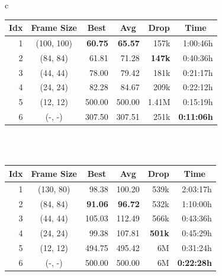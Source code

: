 \begin{table}[htp]
    \begin{center}
        \begin{threeparttable}
            \begin{tabular}{c}
                \begin{tabular}{rcrrrr}
                    \toprule
                    \multicolumn{1}{c}{Idx} & \multicolumn{1}{c}{Frame Size} & \multicolumn{1}{c}{Best} & \multicolumn{1}{c}{Avg} & \multicolumn{1}{c}{Drop} & \multicolumn{1}{c}{Time}\\
                    \midrule
                    1 & (100, 100) & \textbf{60.75} & \textbf{65.57} & 157k & 1:00:46h \\
                    2 & (84, 84) & 61.81 & 71.28 & \textbf{147k} & 0:40:36h \\
                    3 & (44, 44) & 78.00 & 79.42 & 181k & 0:21:17h \\
                    4 & (24, 24) & 82.28 & 84.67 & 209k & 0:22:12h \\
                    5 & (12, 12) & 500.00 & 500.00 & 1.41M & 0:15:19h \\
                    6 & (-, -) & 307.50 & 307.51 & 251k & \textbf{0:11:06h} \\
                    \bottomrule
                \end{tabular} \\
                 \\
                \addlinespace[0.5cm]
                \begin{tabular}{rcrrrr}
                    \toprule
                    \multicolumn{1}{c}{Idx} & \multicolumn{1}{c}{Frame Size} & \multicolumn{1}{c}{Best} & \multicolumn{1}{c}{Avg} & \multicolumn{1}{c}{Drop} & \multicolumn{1}{c}{Time}\\
                    \midrule
                    1 & (130, 80) & 98.38 & 100.20 & 539k & 2:03:17h \\
                    2 & (84, 84) & \textbf{91.06} & \textbf{96.72} & 532k & 1:10:00h \\
                    3 & (44, 44) & 105.03 & 112.49 & 566k & 0:43:36h \\
                    4 & (24, 24) & 99.38 & 107.81 & \textbf{501k} & 0:45:29h \\
                    5 & (12, 12) & 494.75 & 495.42 & 6M & 0:31:24h \\
                    6 & (-, -) & 500.00 & 500.00 & 6M & \textbf{0:22:28h} \\

\end{tabular}
\end{tabular}
\end{threeparttable}
\end{center}
\end{table}
